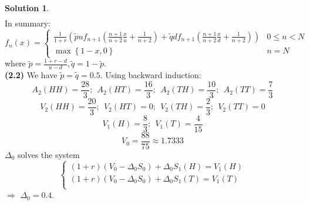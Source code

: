 \documentclass[a4paper, 10pt]{article}
\theoremstyle{definition}
\theoremstyle{hSol}
\newtheorem*{solution}{Solution}
\begin{document}
\begin{solution}
\begin{equation}
\begin{split}
  \end{split}
\end{equation}
In summary:
\begin{equation}
  f_n(x) = \begin{cases}
  \tfrac{1}{1+r}\left(\tilde{p}u f_{n+1}\left(\tfrac{n+1}{n+2}\tfrac{x}{u}+\tfrac{1}{n+2}\right) + \tilde{q}d f_{n+1}\left(\tfrac{n+1}{n+2}\tfrac{x}{d}+\tfrac{1}{n+2}\right)\right) & 0\leq n< N\\
  \max\left\{1 - x, 0\right\} & n=N
  \end{cases}
\end{equation}
where $\tilde{p}=\tfrac{1+r-d}{u-d}, \tilde{q}=1- \tilde{p}$.\\
\textbf{(2.2)} We have $\tilde{p} = \tilde{q} = 0.5$. Using backward induction:
$$
A_2(HH) = \frac{28}{3};~~A_2(HT) = \frac{16}{3};~~A_2(TH) = \frac{10}{3};~~A_2(TT) = \frac{7}{3}
$$
$$
V_2(HH) = \frac{20}{3};~~V_2(HT) = 0;~~V_2(TH) = \frac{2}{3};~~V_2(TT) = 0
$$
$$
V_1(H) = \frac{8}{3};~~V_1(T) = \frac{4}{15}
$$
$$
V_0 = \frac{88}{75} \approx 1.7333
$$
$\Delta_0$ solves the system
\begin{equation}
  \begin{cases}
  (1+r)(V_0 - \Delta_0S_0) + \Delta_0S_1(H) = V_1(H)\\
  (1+r)(V_0 - \Delta_0S_0) + \Delta_0S_1(T) = V_1(T)\\
  \end{cases}
\end{equation}
$\Rightarrow$ $\Delta_0 = 0.4$.
\end{solution} 
\end{document}
